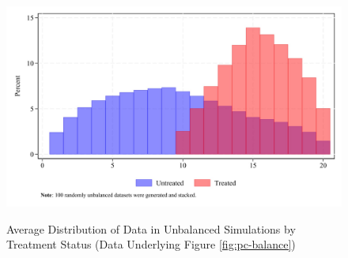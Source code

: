 \documentclass[12pt]{article}
\begin{document}
\begin{figure}
    \centering
    \caption{Average Distribution of Data in Unbalanced Simulations by Treatment Status (Data Underlying Figure \ref{fig:pc-balance})}
    \includegraphics[width=6in]{Figures/Average Distribution of Data in Unbalanced Simulations by Treated.jpg}
    \label{fig:dist-treat}
\end{figure}

\end{document}
